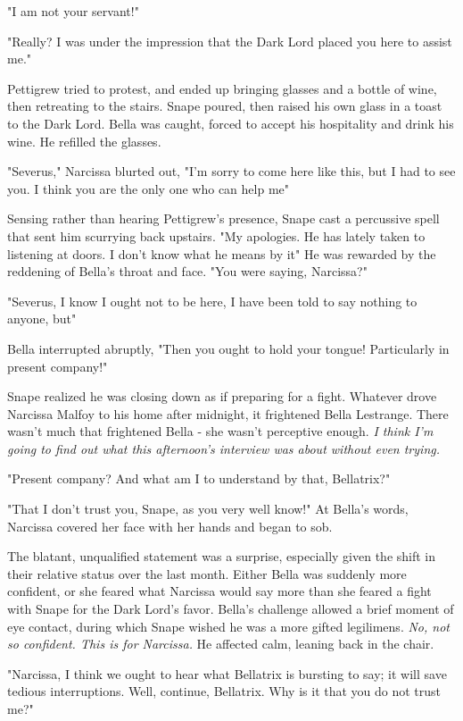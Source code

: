 "I am not your servant!"

"Really? I was under the impression that the Dark Lord placed you here to assist me."

Pettigrew tried to protest, and ended up bringing glasses and a bottle of wine, then retreating to the stairs. Snape poured, then raised his own glass in a toast to the Dark Lord. Bella was caught, forced to accept his hospitality and drink his wine. He refilled the glasses.

"Severus," Narcissa blurted out, "I'm sorry to come here like this, but I had to see you. I think you are the only one who can help me{\el}"

Sensing rather than hearing Pettigrew's presence, Snape cast a percussive spell that sent him scurrying back upstairs. "My apologies. He has lately taken to listening at doors. I don't know what he means by it{\el}" He was rewarded by the reddening of Bella's throat and face. "You were saying, Narcissa?"

"Severus, I know I ought not to be here, I have been told to say nothing to anyone, but{\el}"

Bella interrupted abruptly, "Then you ought to hold your tongue! Particularly in present company!"

Snape realized he was closing down as if preparing for a fight. Whatever drove Narcissa Malfoy to his home after midnight, it frightened Bella Lestrange. There wasn't much that frightened Bella - she wasn't perceptive enough. \emph{I think I'm going to find out what this afternoon's interview was about without even trying.}

"Present company? And what am I to understand by that, Bellatrix?"

"That I don't trust you, Snape, as you very well know!" At Bella's words, Narcissa covered her face with her hands and began to sob.

The blatant, unqualified statement was a surprise, especially given the shift in their relative status over the last month. Either Bella was suddenly more confident, or she feared what Narcissa would say more than she feared a fight with Snape for the Dark Lord's favor. Bella's challenge allowed a brief moment of eye contact, during which Snape wished he was a more gifted legilimens. \emph{No, not so confident. This is for Narcissa.} He affected calm, leaning back in the chair.

"Narcissa, I think we ought to hear what Bellatrix is bursting to say; it will save tedious interruptions. Well, continue, Bellatrix. Why is it that you do not trust me?"

